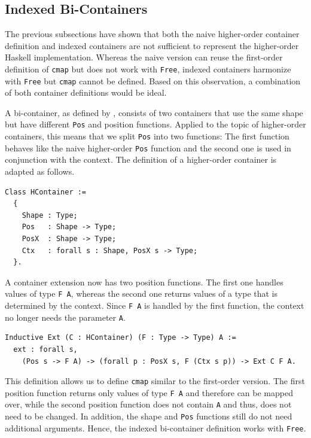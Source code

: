 \documentclass[a4paper, 11pt, fleqn, twoside]{scrreprt}
\newcommand{\cinl}[1]{\texttt{#1}}
\begin{document}
\subsection{Indexed Bi-Containers}
The previous subsections have shown that both the naive higher-order container definition and indexed containers are not sufficient to represent the higher-order Haskell implementation.
Whereas the naive version can reuse the first-order definition of \cinl{cmap} but does not work with \cinl{Free}, indexed containers harmonize with \cinl{Free} but \cinl{cmap} cannot be defined.
Based on this observation, a combination of both container definitions would be ideal.

A bi-container, as defined by \citet{ghani2007higherDimensional}, consists of two containers that use the same shape but have different \cinl{Pos} and position functions.
Applied to the topic of higher-order containers, this means that we split \cinl{Pos} into two functions: The first function behaves like the naive higher-order \cinl{Pos} function and the second one is used in conjunction with the context.
The definition of a higher-order container is adapted as follows.

\begin{verbatim}
Class HContainer :=
  {
    Shape : Type;
    Pos   : Shape -> Type;
    PosX  : Shape -> Type;
    Ctx   : forall s : Shape, PosX s -> Type;
  }.
\end{verbatim}

A container extension now has two position functions.
The first one handles values of type \cinl{F A}, whereas the second one returns values of a type that is determined by the context.
Since \cinl{F A} is handled by the first function, the context no longer needs the parameter \cinl{A}.

\begin{verbatim}
Inductive Ext (C : HContainer) (F : Type -> Type) A :=
  ext : forall s, 
    (Pos s -> F A) -> (forall p : PosX s, F (Ctx s p)) -> Ext C F A.
\end{verbatim}

This definition allows us to define \cinl{cmap} similar to the first-order version.
The first position function returns only values of type \cinl{F A} and therefore can be mapped over, while the second position function does not contain \cinl{A} and thus, does not need to be changed.
In addition, the shape and \cinl{Pos} functions still do not need additional arguments.
Hence, the indexed bi-container definition works with \cinl{Free}.
\end{document}
